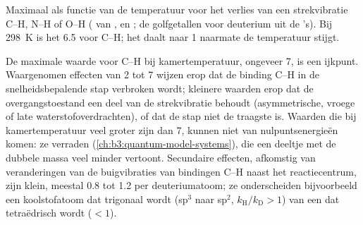 \begin{omfigure}

{\small Maximaal  als functie van de
temperatuur voor het verlies van een strekvibratie C--H, N--H of O--H
( van ,  en ; de
golfgetallen voor deuterium uit de 's). Bij
\qty{298}{K} is het 6.5 voor C--H; het daalt naar 1 naarmate de
temperatuur stijgt.}
\end{omfigure}

De maximale waarde voor C--H bij kamertemperatuur, ongeveer 7, is een
ijkpunt. Waargenomen effecten van 2 tot 7 wijzen erop dat de binding C--H
in de snelheidsbepalende stap verbroken wordt; kleinere waarden erop dat
de overgangstoestand een deel van de strekvibratie behoudt
(asymmetrische, vroege of late waterstofoverdrachten), of dat de stap niet
de traagste is. Waarden die bij kamertemperatuur veel groter zijn dan 7,
kunnen niet van nulpuntsenergieën komen: ze verraden 
(\cref{ch:b3:quantum-model-systems}), die een deeltje met de dubbele massa
veel minder vertoont. Secundaire effecten, afkomstig van veranderingen van
de buigvibraties van bindingen C--H naast het reactiecentrum, zijn klein,
meestal 0.8 tot 1.2 per deuteriumatoom; ze onderscheiden bijvoorbeeld een
koolstofatoom dat trigonaal wordt (sp$^3$ naar sp$^2$, $k_{\mathrm H}/k_{\mathrm D} > 1$) van een dat
tetraëdrisch wordt ($< 1$).

